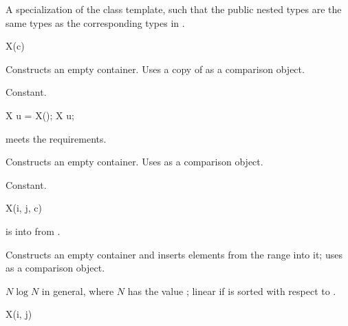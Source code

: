 \begin{itemdescr}
\pnum
\result
A specialization of
the  class template,
such that the public nested types are
the same types as the corresponding types in .
\end{itemdescr}

%
%
%
%
\begin{itemdecl}
X(c)
\end{itemdecl}

\begin{itemdescr}
\pnum
\effects
Constructs an empty container.
Uses a copy of  as a comparison object.

\pnum
\complexity
Constant.
\end{itemdescr}

%
%
%
%
\begin{itemdecl}
X u = X();
X u;
\end{itemdecl}

\begin{itemdescr}
\pnum
\expects
{} meets the  requirements.

\pnum
\effects
Constructs an empty container.
Uses  as a comparison object.

\pnum
\complexity
Constant.
\end{itemdescr}

%
%
%
%
\begin{itemdecl}
X(i, j, c)
\end{itemdecl}

\begin{itemdescr}
\pnum
\expects
{} is
 into  from .

\pnum
\effects
Constructs an empty container and
inserts elements from the range  into it;
uses  as a comparison object.

\pnum
\complexity
$N \log N$ in general, where $N$ has the value ;
linear if  is sorted with respect to .
\end{itemdescr}

%
%
%
%
\begin{itemdecl}
X(i, j)
\end{itemdecl}


